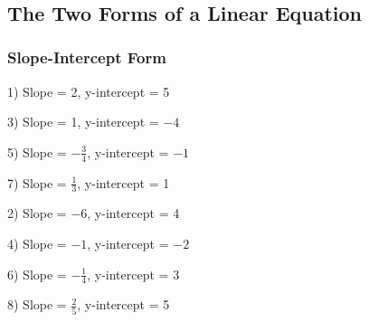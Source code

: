 \vspace{2in}
~

\pagebreak

\subsection{The Two Forms of a Linear Equation}\par

	\subsubsection{Slope-Intercept Form}\par

{}

\begin{multicols}{2}
  1) Slope = 2, y-intercept = 5
  
  3) Slope = 1, y-intercept = $- 4$
  
  5) Slope = $- \frac{3}{4}$, y-intercept = $- 1$
  
  7) Slope = $\frac{1}{3}$, y-intercept = 1
  
  2) Slope = $- 6$, y-intercept = 4
  
  4) Slope = $- 1$, y-intercept = $- 2$
  
  6) Slope = $- \frac{1}{4}$, y-intercept = 3
  
  8) Slope = $\frac{2}{5}$, y-intercept = 5
\end{multicols}

{}

